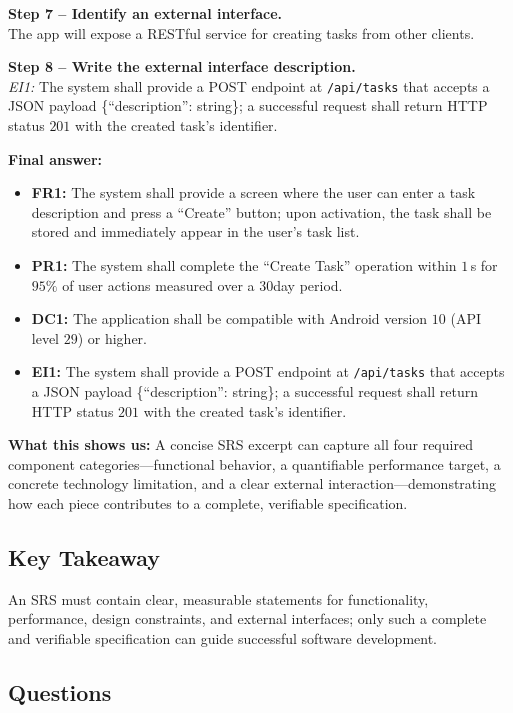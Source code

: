 \documentclass[12pt, a4paper]{article}
\begin{document}
\textbf{Step 7 -- Identify an external interface.}\\
The app will expose a RESTful service for creating tasks from other clients.

\textbf{Step 8 -- Write the external interface description.}\\
\textit{EI1:} The system shall provide a POST endpoint at \texttt{/api/tasks} that accepts a JSON payload \{``description'': string\}; a successful request shall return HTTP status $201$ with the created task's identifier.

\textbf{Final answer:}\\
\begin{itemize}
  \item \textbf{FR1:} The system shall provide a screen where the user can enter a task description and press a ``Create'' button; upon activation, the task shall be stored and immediately appear in the user's task list.
  \item \textbf{PR1:} The system shall complete the ``Create Task'' operation within $1\,$s for $95\%$ of user actions measured over a 30day period.
  \item \textbf{DC1:} The application shall be compatible with Android version $10$ (API level $29$) or higher.
  \item \textbf{EI1:} The system shall provide a POST endpoint at \texttt{/api/tasks} that accepts a JSON payload \{``description'': string\}; a successful request shall return HTTP status $201$ with the created task's identifier.
\end{itemize}

\textbf{What this shows us:}  
A concise SRS excerpt can capture all four required component categories---functional behavior, a quantifiable performance target, a concrete technology limitation, and a clear external interaction---demonstrating how each piece contributes to a complete, verifiable specification.  

\subsection{Key Takeaway}
An SRS must contain clear, measurable statements for functionality, performance, design constraints, and external interfaces; only such a complete and verifiable specification can guide successful software development.

\subsection{Questions}
\end{document}
